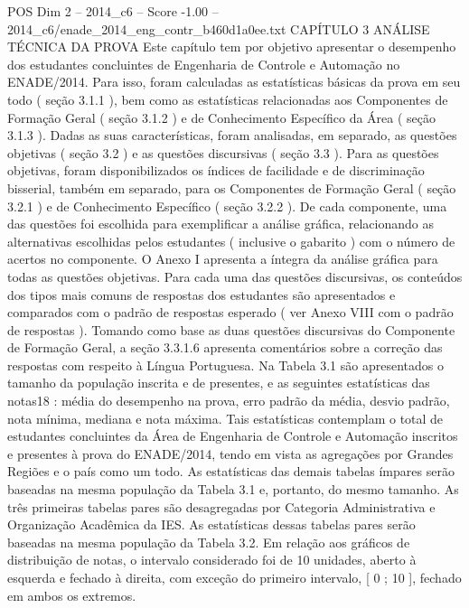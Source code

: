 \begin{textsample}{POS Dim 2 – 2014\_c6 – Score -1.00 – 2014\_c6/enade\_2014\_eng\_contr\_b460d1a0ee.txt}  \label{ex:f2_pos_233}
CAPÍTULO 3 ANÁLISE TÉCNICA DA PROVA Este capítulo tem por objetivo apresentar o desempenho dos estudantes concluintes de Engenharia de Controle e Automação no ENADE/2014.
Para isso, foram calculadas as estatísticas básicas da prova em seu todo ( seção 3.1.1 ), bem como as estatísticas relacionadas aos Componentes de Formação Geral ( seção 3.1.2 ) e de Conhecimento Específico da Área ( seção 3.1.3 ).
Dadas as suas características, foram analisadas, em separado, as questões objetivas ( seção 3.2 ) e as questões discursivas ( seção 3.3 ).
Para as questões objetivas, foram disponibilizados os índices de facilidade e de discriminação bisserial, também em separado, para os Componentes de Formação Geral ( seção 3.2.1 ) e de Conhecimento Específico ( seção 3.2.2 ).
De cada componente, uma das questões foi escolhida para exemplificar a análise gráfica, relacionando as alternativas escolhidas pelos estudantes ( inclusive o gabarito ) com o número de acertos no componente.
O Anexo I apresenta a íntegra da análise gráfica para todas as questões objetivas.
Para cada uma das questões discursivas, os conteúdos dos tipos mais comuns de respostas dos estudantes são apresentados e comparados com o padrão de respostas esperado ( ver Anexo VIII com o padrão de respostas ).
Tomando como base as duas questões discursivas do Componente de Formação Geral, a seção 3.3.1.6 apresenta comentários sobre a correção das respostas com respeito à Língua Portuguesa.
Na Tabela 3.1 são apresentados o tamanho da população inscrita e de presentes, e as seguintes estatísticas das notas18 : média do desempenho na prova, erro padrão da média, desvio padrão, nota mínima, mediana e nota máxima.
Tais estatísticas contemplam o total de estudantes concluintes da Área de Engenharia de Controle e Automação inscritos e presentes à prova do ENADE/2014, tendo em vista as agregações por Grandes Regiões e o país como um todo.
As estatísticas das demais tabelas ímpares serão baseadas na mesma população da Tabela 3.1 e, portanto, do mesmo tamanho.
As três primeiras tabelas pares são desagregadas por Categoria Administrativa e Organização Acadêmica da IES.
As estatísticas dessas tabelas pares serão baseadas na mesma população da Tabela 3.2.
Em relação aos gráficos de distribuição de notas, o intervalo considerado foi de 10 unidades, aberto à esquerda e fechado à direita, com exceção do primeiro intervalo, [ 0 ; 10 ], fechado em ambos os extremos.

\end{textsample}
